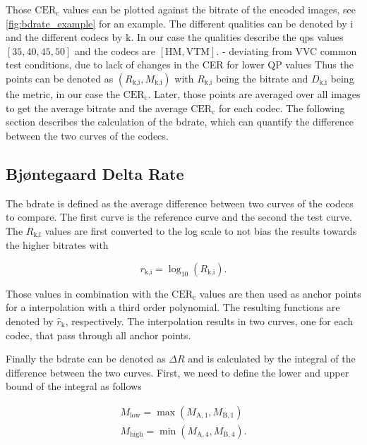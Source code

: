 Those $\text{CER}_{\text{c}}$ values can be plotted against the bitrate of the encoded images, see \autoref{fig:bdrate_example} for an example.
The different qualities can be denoted by $\text{i}$ and the different codecs by $\text{k}$.
In our case the qualities describe the \glspl{qp} values $[35, 40, 45, 50]$ and the codecs are $[\text{HM}, \text{VTM}]$.
- deviating from VVC common test conditions, due to lack of changes in the CER for lower QP values
Thus the points can be denoted as $\left(R_{\text{k,i}}, M_{\text{k,i}}\right)$ with $R_{\text{k,i}}$ being the bitrate and $D_{\text{k,i}}$ being the metric, in our case the $\text{CER}_{\text{c}}$.
Later, those points are averaged over all images to get the average bitrate and the average $\text{CER}_{\text{c}}$ for each codec.
The following section describes the calculation of the \gls{bdrate}, which can quantify the difference between the two curves of the codecs.

\subsection{Bjøntegaard Delta Rate}
\label{subsec:bdrate}

The \gls{bdrate} \cite{bdrate_original_2001}\cite{bdrate_beyond_2022} is defined as the average difference between two curves of the codecs to compare.
The first curve is the reference curve and the second the test curve.
The $R_{\text{k,i}}$ values are first converted to the log scale to not bias the results towards the higher bitrates with

\begin{equation}
    r_{\text{k,i}} = \log_{10}\left(R_{\text{k,i}}\right).
    \label{eq:log_scale}
\end{equation}

Those values in combination with the $\text{CER}_{\text{c}}$ values are then used as anchor points for a interpolation with a third order polynomial.
The resulting functions are denoted by $\hat{r}_{\text{k}}$, respectively.
The interpolation results in two curves, one for each codec, that pass through all anchor points.

Finally the \gls{bdrate} can be denoted as $\Delta R$ and is calculated by the integral of the difference between the two curves.
First, we need to define the lower and upper bound of the integral as follows

\begin{equation}
    \begin{aligned}
        M_{\text{low}} = \max\left(M_{\text{A},1}, M_{\text{B},1}\right) \\
        M_{\text{high}} = \min\left(M_{\text{A},4}, M_{\text{B},4}\right).
    \end{aligned}
    \label{eq:bounds}
\end{equation}


